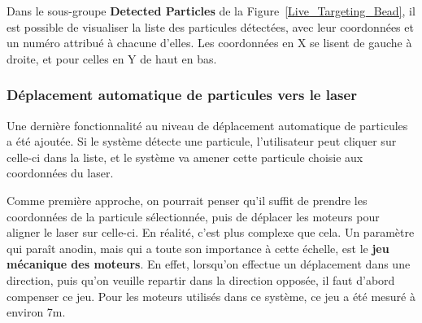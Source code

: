 Dans le sous-groupe \textbf{Detected Particles} de la Figure~\ref{Live_Targeting_Bead}, il est possible de visualiser la liste des particules détectées, avec leur coordonnées et un numéro attribué à chacune d'elles. Les coordonnées en X se lisent de gauche à droite, et pour celles en Y de haut en bas.

\newpage
\subsubsection{Déplacement automatique de particules vers le laser}
Une dernière fonctionnalité au niveau de déplacement automatique de particules a été ajoutée. Si le système détecte une particule, l'utilisateur peut cliquer sur celle-ci dans la liste, et le système va amener cette particule choisie aux coordonnées du laser.

Comme première approche, on pourrait penser qu'il suffit de prendre les coordonnées de la particule sélectionnée, puis de déplacer les moteurs pour aligner le laser sur celle-ci. En réalité, c'est plus complexe que cela. Un paramètre qui paraît anodin, mais qui a toute son importance à cette échelle, est le \textbf{jeu mécanique des moteurs}. En effet, lorsqu'on effectue un déplacement dans une direction, puis qu'on veuille repartir dans la direction opposée, il faut d'abord compenser ce jeu. Pour les moteurs utilisés dans ce système, ce jeu a été mesuré à environ 7\textmu m.

